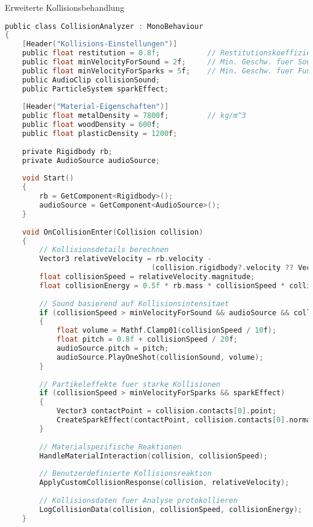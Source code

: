 \begin{code}{Erweiterte Kollisionsbehandlung}
\begin{lstlisting}[language=C, style=basesmol]
public class CollisionAnalyzer : MonoBehaviour 
{
    [Header("Kollisions-Einstellungen")]
    public float restitution = 0.8f;           // Restitutionskoeffizient
    public float minVelocityForSound = 2f;     // Min. Geschw. fuer Sound
    public float minVelocityForSparks = 5f;    // Min. Geschw. fuer Funken
    public AudioClip collisionSound;
    public ParticleSystem sparkEffect;
    
    [Header("Material-Eigenschaften")]
    public float metalDensity = 7800f;         // kg/m^3
    public float woodDensity = 600f;
    public float plasticDensity = 1200f;
    
    private Rigidbody rb;
    private AudioSource audioSource;
    
    void Start() 
    {
        rb = GetComponent<Rigidbody>();
        audioSource = GetComponent<AudioSource>();
    }
    
    void OnCollisionEnter(Collision collision) 
    {
        // Kollisionsdetails berechnen
        Vector3 relativeVelocity = rb.velocity - 
                                  (collision.rigidbody?.velocity ?? Vector3.zero);
        float collisionSpeed = relativeVelocity.magnitude;
        float collisionEnergy = 0.5f * rb.mass * collisionSpeed * collisionSpeed;
        
        // Sound basierend auf Kollisionsintensitaet
        if (collisionSpeed > minVelocityForSound && audioSource && collisionSound) 
        {
            float volume = Mathf.Clamp01(collisionSpeed / 10f);
            float pitch = 0.8f + collisionSpeed / 20f;
            audioSource.pitch = pitch;
            audioSource.PlayOneShot(collisionSound, volume);
        }
        
        // Partikeleffekte fuer starke Kollisionen
        if (collisionSpeed > minVelocityForSparks && sparkEffect) 
        {
            Vector3 contactPoint = collision.contacts[0].point;
            CreateSparkEffect(contactPoint, collision.contacts[0].normal);
        }
        
        // Materialspezifische Reaktionen
        HandleMaterialInteraction(collision, collisionSpeed);
        
        // Benutzerdefinierte Kollisionsreaktion
        ApplyCustomCollisionResponse(collision, relativeVelocity);
        
        // Kollisionsdaten fuer Analyse protokollieren
        LogCollisionData(collision, collisionSpeed, collisionEnergy);
    }
    

\end{lstlisting}
\end{code}
